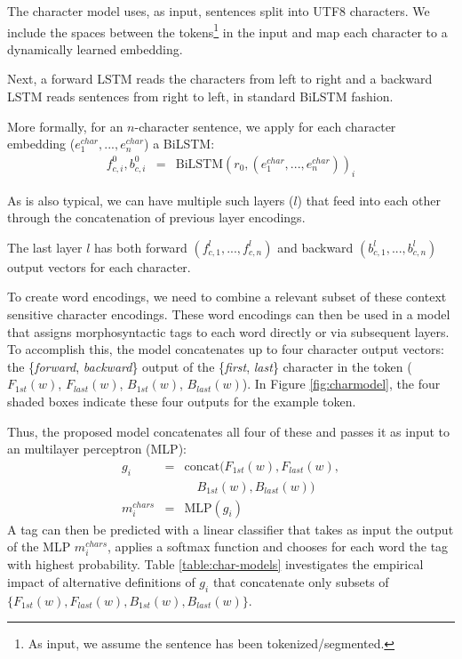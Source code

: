 \documentclass[11pt,a4paper]{article}
\newcommand{\forwardfirst}{\textit{F$_{1st}(w)$}}
\newcommand{\backwardfirst}{\textit{B$_{1st}(w)$}}
\newcommand{\forwardlast}{\textit{F$_{last}(w)$}}
\newcommand{\backwardlast}{\textit{B$_{last}(w)$}}
\begin{document}
The character model uses, as input, sentences split into UTF8 characters. We include the spaces between the tokens\footnote{As input, we assume the sentence has been tokenized/segmented.} in the input and map each character to a dynamically learned embedding.


Next, a forward LSTM reads the characters from left to right and a backward LSTM reads sentences from right to left, in standard BiLSTM fashion.

More formally, for an $n$-character sentence, we apply for each character embedding ($e_1^{char}, ..., e_n^{char}$) a BiLSTM:     
\begin{eqnarray*}
\nonumber
f_{c,i}^0, b_{c,i}^0 &=&\textrm{BiLSTM}(r_0,(e_1^{char}, ..., e_n^{char}))_i \end{eqnarray*}

As is also typical, we can have multiple such layers ($l$) that feed into each other through the concatenation of previous layer encodings.

The last layer $l$ has both forward $(f_{c,1}^l, ..., f_{c,n}^l)$ and backward $(b_{c,1}^l, ..., b_{c,n}^l)$ output vectors for each character. 

To create word encodings, we need to
combine a relevant subset of these context sensitive character encodings.
These word encodings can then be used in a model that assigns morphosyntactic tags to each word directly or via subsequent layers.
To accomplish this, the model concatenates up to four character output vectors: the \{\emph{forward}, \emph{backward}\} output of the \{\emph{first}, \emph{last}\} character in the token ($\forwardfirst$, $\forwardlast$, $\backwardfirst$, $\backwardlast$).  In Figure \ref{fig:charmodel}, the four
shaded boxes indicate these four outputs for the example token.

Thus, the proposed model concatenates all four of these and passes it as input to an multilayer perceptron (MLP):
\begin{eqnarray}
g_i & = & \textrm{concat}(\forwardfirst, \forwardlast, \nonumber  \\
& & \quad \backwardfirst, \backwardlast)  \label{eq:gi} \\
m_i^{chars} &=&\textrm{MLP}(g_i) \label{equation:mlp-char}\nonumber  
\end{eqnarray}
A tag can then be predicted with a linear classifier 
that takes as input the output of the MLP $m_i^{chars}$, applies a softmax function and chooses for each word the tag with highest probability. 
Table \ref{table:char-models} investigates
the empirical impact of alternative
definitions of $g_i$ that concatenate only subsets of $\{\forwardfirst, \forwardlast, \backwardfirst, \backwardlast\}$.
\end{document}

